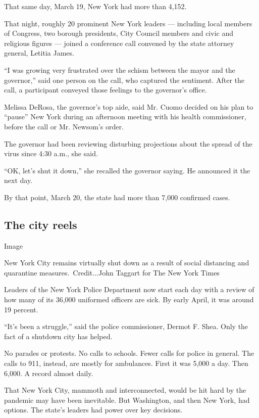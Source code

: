 That same day, March 19, New York had more than 4,152.

That night, roughly 20 prominent New York leaders --- including local
members of Congress, two borough presidents, City Council members and
civic and religious figures --- joined a conference call convened by the
state attorney general, Letitia James.

``I was growing very frustrated over the schism between the mayor and
the governor,'' said one person on the call, who captured the sentiment.
After the call, a participant conveyed those feelings to the governor's
office.

Melissa DeRosa, the governor's top aide, said Mr. Cuomo decided on his
plan to ``pause'' New York during an afternoon meeting with his health
commissioner, before the call or Mr. Newsom's order.

The governor had been reviewing disturbing projections about the spread
of the virus since 4:30 a.m., she said.

``OK, let's shut it down,'' she recalled the governor saying. He
announced it the next day.

By that point, March 20, the state had more than 7,000 confirmed cases.

\hypertarget{the-city-reels}{%
\subsection{The city reels}\label{the-city-reels}}

Image

New York City remains virtually shut down as a result of social
distancing and quarantine measures.~Credit...John Taggart for The New
York Times

Leaders of the New York Police Department now start each day with a
review of how many of its 36,000 uniformed officers are sick. By early
April, it was around 19 percent.

``It's been a struggle,'' said the police commissioner, Dermot F. Shea.
Only the fact of a shutdown city has helped.

No parades or protests. No calls to schools. Fewer calls for police in
general. The calls to 911, instead, are mostly for ambulances. First it
was 5,000 a day. Then 6,000. A record almost daily.

That New York City, mammoth and interconnected, would be hit hard by the
pandemic may have been inevitable. But Washington, and then New York,
had options. The state's leaders had power over key decisions.

